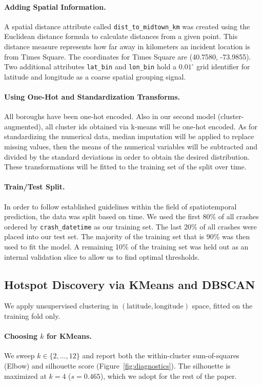 \documentclass{article}
\begin{document}
\paragraph{Adding Spatial Information.} A spatial distance attribute called
\texttt{dist\_to\_midtown\_km} was created using the Euclidean distance
formula to calculate distances from a given point. This distance measure
represents how far away in kilometers an incident location is from Times
Square. The coordinates for Times Square are (40.7580, -73.9855). Two
additional attributes \texttt{lat\_bin} and \texttt{lon\_bin} hold a
$0.01^\circ$ grid identifier for latitude and longitude as a coarse spatial
grouping signal.
\paragraph{Using One-Hot and Standardization Transforms.} All boroughs have
been one-hot encoded. Also in our second model (cluster-augmented), all
cluster ids obtained via k-means will be one-hot encoded. As for
standardizing the numerical data, median imputation will be applied to
replace missing values, then the means of the numerical variables will be
subtracted and divided by the standard deviations in order to obtain the
desired distribution. These transformations will be fitted to the training
set of the split over time.
\paragraph{Train/Test Split.} In order to follow established guidelines
within the field of spatiotemporal prediction, the data was split based on
time. We used the first 80\% of all crashes ordered by
\texttt{crash\_datetime} as our training set. The last 20\% of all crashes
were placed into our test set. The majority of the training set that is
90\% was then used to fit the model. A remaining 10\% of the training set
was held out as an internal validation slice to allow us to find optimal
thresholds.

\subsection{Hotspot Discovery via KMeans and DBSCAN}
\label{sec:cluster}
We apply unsupervised clustering in $(\text{latitude}, \text{longitude})$
space, fitted on the training fold only.

\paragraph{Choosing $k$ for KMeans.} We sweep $k\in\{2,\dots,12\}$ and report
both the within-cluster sum-of-squares (Elbow) and silhouette score
(Figure~\ref{fig:diagnostics}). The silhouette is maximized at $k\!=\!4$
($s\!=\!0.465$), which we adopt for the rest of the paper.
\end{document}
